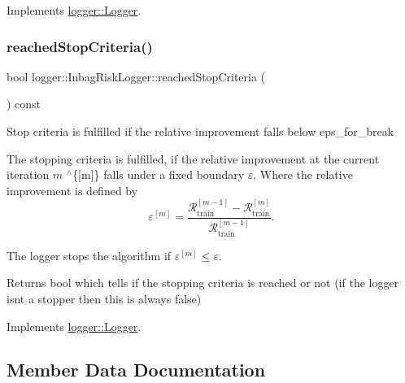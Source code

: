 Implements \mbox{\hyperlink{classlogger_1_1_logger_abad818a7e8053ca84cb267e883b5e377}{logger\+::\+Logger}}.

\mbox{\label{classlogger_1_1_inbag_risk_logger_a17a7416e4cc9db4da3b3eda5012ad7c7}} 
\subsubsection{\texorpdfstring{reached\+Stop\+Criteria()}{reachedStopCriteria()}}
{\footnotesize\ttfamily bool logger\+::\+Inbag\+Risk\+Logger\+::reached\+Stop\+Criteria (\begin{DoxyParamCaption}{ }\end{DoxyParamCaption}) const\hspace{0.3cm}{\ttfamily [virtual]}}



Stop criteria is fulfilled if the relative improvement falls below {\ttfamily eps\+\_\+for\+\_\+break} 

The stopping criteria is fulfilled, if the relative improvement at the current iteration $m$ $^\wedge$\{\mbox{[}m\mbox{]}\} falls under a fixed boundary $\varepsilon$. Where the relative improvement is defined by \[ \varepsilon^{[m]} = \frac{\mathcal{R}_\mathrm{train}^{[m-1]} - \mathcal{R}_\mathrm{train}^{[m]}}{\mathcal{R}_\mathrm{train}^{[m-1]}}. \]

The logger stops the algorithm if $\varepsilon^{[m]} \leq \varepsilon$.

\begin{DoxyReturn}{Returns}
{\ttfamily bool} which tells if the stopping criteria is reached or not (if the logger isn\textquotesingle{}t a stopper then this is always false) 
\end{DoxyReturn}


Implements \mbox{\hyperlink{classlogger_1_1_logger_aed91421c07062b91cee158ef2bda7ae8}{logger\+::\+Logger}}.



\subsection{Member Data Documentation}
\mbox{\label{classlogger_1_1_inbag_risk_logger_a1890b49b8ffe85e1bc65b4f8ab7999fe}} 
